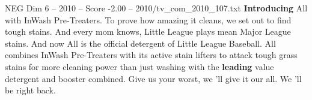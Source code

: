 \begin{textsample}{NEG Dim 6 – 2010 – Score -2.00 – 2010/tv\_com\_2010\_107.txt}  \label{ex:f6_neg_045}
\textbf{Introducing} All with InWash Pre-Treaters.
To prove how amazing it cleans, we set out to find tough stains.
And every mom knows, Little League plays mean Major League stains.
And now All is the official detergent of Little League Baseball.
All combines InWash Pre-Treaters with its active stain lifters to attack tough grass stains for more cleaning power than just washing with the \textbf{leading} value detergent and booster combined.
Give us your worst, we 'll give it our all.
We 'll be right back.

\end{textsample}
